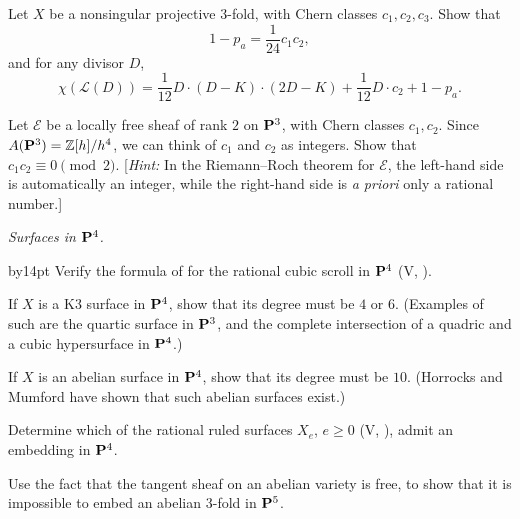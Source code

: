 {{\smallskip
\noindent\hypertarget{ex-A-6.7}{}Let $X$ be a nonsingular projective $3$-fold, with Chern classes $c_1,c_2,c_3$. Show that
\[
1-p_a=\frac1{24}c_1c_2,
\]
and for any divisor $D$,
\[
\chi(\mathcal L(D))=\frac1{12}D\cdot(D-K)\cdot(2D-K)+\frac1{12}D\cdot c_2+1-p_a.
\]

\smallskip
\noindent\hypertarget{ex-A-6.8}{}Let $\mathcal E$ be a locally free sheaf of rank $2$ on $\mathbf{P}^3$, with Chern classes $c_1,c_2$. Since $A(\mathbf{P}^3)=\mathbb Z[h]/h^4$, we can think of $c_1$ and $c_2$ as integers. Show that $c_1c_2\equiv0\pmod 2$. [\emph{Hint:} In the Riemann--Roch theorem for $\mathcal E$, the left-hand side is automatically an integer, while the right-hand side is \emph{a priori} only a rational number.]

\smallskip
\noindent\hypertarget{ex-A-6.9}{}\emph{Surfaces in $\mathbf{P}^4$.}\par
{\advance\leftskip by14pt
\noindent\hypertarget{ex-A-6.9a}{}Verify the formula of  for the rational cubic scroll in $\mathbf{P}^4$ (V, ).

\noindent\hypertarget{ex-A-6.9b}{}If $X$ is a K3 surface in $\mathbf{P}^4$, show that its degree must be $4$ or $6$. (Examples of such are the quartic surface in $\mathbf{P}^3$, and the complete intersection of a quadric and a cubic hypersurface in $\mathbf{P}^4$.)

\noindent\hypertarget{ex-A-6.9c}{}If $X$ is an abelian surface in $\mathbf{P}^4$, show that its degree must be $10$. (Horrocks and Mumford  have shown that such abelian surfaces exist.)

\noindent\hypertarget{ex-A-6.9d}{}Determine which of the rational ruled surfaces $X_e$, $e\geq0$ (V, ), admit an embedding in $\mathbf{P}^4$.\par}

\smallskip
\noindent\hypertarget{ex-A-6.10}{}Use the fact that the tangent sheaf on an abelian variety is free, to show that it is impossible to embed an abelian $3$-fold in $\mathbf{P}^5$.\par}
}
